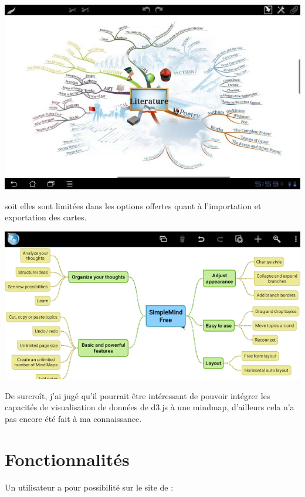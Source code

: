 \documentclass[11pt,a4paper,margin=0.5in]{report}
\begin{document}
\begin{center}
\includegraphics[scale=0.33]{ex1.jpg} \\[0.25in]
\end{center}

soit elles sont limitées dans les options offertes quant à l'importation et exportation des cartes. \\

\begin{center}
\includegraphics[scale=0.33]{unnamed.png} \\[0.25in]
\end{center}

De surcroît, j'ai jugé qu'il pourrait être intéressant de pouvoir intégrer les capacités de visualisation de données de d3.js à une mindmap, d'ailleurs cela n'a pas encore été fait à ma connaissance.

\section{Fonctionnalités}

Un utilisateur a pour possibilité sur le site de :
\end{document}

